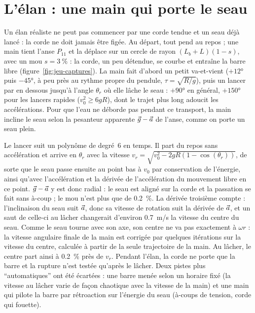 \section{L'élan : une main qui porte le seau}
\label{sec:jeu-main}

Un élan réaliste ne peut pas commencer par une corde tendue et un seau déjà
lancé : la corde ne doit jamais être figée. Au départ, tout pend au repos ; une
main tient l'anse \(P_{11}\) et la déplace sur un cercle de rayon
\((L_b + L)(1 - s)\), avec un mou \(s = \SI{3}{\percent}\) : la corde, un peu détendue,
se courbe et entraîne la barre libre (figure~\ref{fig:jeu-captures}). La main fait
d'abord un petit va-et-vient (\(+\ang{12}\) puis \(-\ang{45}\), à peu près au rythme
propre du pendule, \(\tau = \sqrt{R/g}\)), puis un lancer par en dessous jusqu'à
l'angle \(\theta_r\) où elle lâche le seau : \(+\ang{90}\) en général, \(+\ang{150}\) pour
les lancers rapides (\(v_0^2 \geq 6 g R\)), dont le trajet plus long adoucit les
accélérations. Pour que l'eau ne déborde pas pendant ce transport, la main incline
le seau selon la pesanteur apparente \(\vec{g} - \vec{a}\) de l'anse, comme on
porte un seau plein.

Le lancer suit un polynôme de degré~6 en temps. Il part du repos sans
accélération et arrive en \(\theta_r\) avec la vitesse
\(v_r = \sqrt{v_0^2 - 2 g R (1 - \cos(\theta_r))}\), de sorte que le seau passe
ensuite au point bas à \(v_0\) par conservation de l'énergie, ainsi qu'avec
l'accélération et la dérivée de l'accélération du mouvement libre en ce point.
\(\vec{g} - \vec{a}\) y est donc radial : le seau est aligné sur la corde et la
passation se fait sans à-coup ; le mou n'est plus que de \SI{0,2}{\percent}. La
dérivée troisième compte : l'inclinaison du seau suit \(\vec{a}\), donc sa vitesse
de rotation suit la dérivée de \(\vec{a}\), et un saut de celle-ci au lâcher
changerait d'environ \SI{0,7}{m/s} la vitesse du centre du seau. Comme le seau
tourne avec son axe, son centre ne va pas exactement à \(\omega r\) : la vitesse
angulaire finale de la main est corrigée par quelques itérations sur la vitesse
du centre, calculée à partir de la seule trajectoire de la main. Au lâcher, le
centre part ainsi à \SI{0,2}{\percent} près de \(v_r\). Pendant l'élan, la corde ne porte que la barre
et la rupture n'est testée qu'après le lâcher. Deux pistes plus
\enquote{automatiques} ont été écartées : une barre menée selon un horaire fixé
(la vitesse au lâcher varie de façon chaotique avec la vitesse de la main) et
une main qui pilote la barre par rétroaction sur l'énergie du seau (à-coups de
tension, corde qui fouette).

